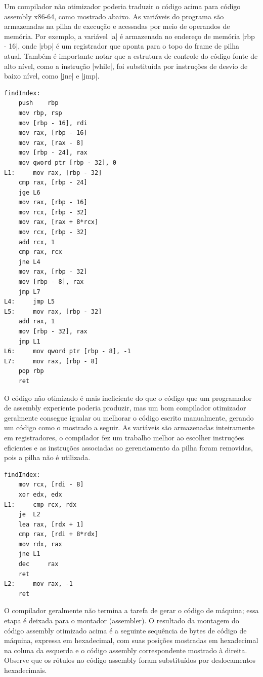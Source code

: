 Um compilador não otimizador poderia traduzir o código acima para
código assembly x86-64, como mostrado abaixo. As variáveis
do programa são armazenadas na pilha de
execução e acessadas por meio de operandos de memória. Por exemplo, a
variável \haskell|a| é armazenada no endereço de
memória \asm|rbp - 16|, onde
\haskell|rbp| é um registrador que aponta para o topo
do frame de pilha atual. Também é importante notar que a estrutura de
controle do código-fonte de alto nível, como a instrução
\javascript|while|, foi substituída por instruções de
desvio de baixo nível, como \asm|jne| e
\asm|jmp|.

\begin{verbatim}
findIndex:
    push    rbp
    mov rbp, rsp
    mov [rbp - 16], rdi
    mov rax, [rbp - 16]
    mov rax, [rax - 8]
    mov [rbp - 24], rax
    mov qword ptr [rbp - 32], 0
L1:     mov rax, [rbp - 32]
    cmp rax, [rbp - 24]
    jge L6
    mov rax, [rbp - 16]
    mov rcx, [rbp - 32]
    mov rax, [rax + 8*rcx]
    mov rcx, [rbp - 32]
    add rcx, 1
    cmp rax, rcx
    jne L4
    mov rax, [rbp - 32]
    mov [rbp - 8], rax
    jmp L7
L4:     jmp L5
L5:     mov rax, [rbp - 32]
    add rax, 1
    mov [rbp - 32], rax
    jmp L1
L6:     mov qword ptr [rbp - 8], -1
L7:     mov rax, [rbp - 8]
    pop rbp
    ret
\end{verbatim}

O código não otimizado é mais ineficiente do que o código que um
programador de assembly experiente poderia produzir, mas um bom
compilador otimizador geralmente consegue igualar ou melhorar o
código escrito manualmente, gerando um código como o mostrado a seguir.
As variáveis são armazenadas inteiramente em registradores, o compilador
fez um trabalho melhor ao
escolher instruções eficientes e as instruções associadas ao
gerenciamento da pilha foram removidas, pois a pilha não é utilizada.

\begin{verbatim}
findIndex:
    mov rcx, [rdi - 8]
    xor edx, edx
L1:     cmp rcx, rdx
    je  L2
    lea rax, [rdx + 1]
    cmp rax, [rdi + 8*rdx]
    mov rdx, rax
    jne L1
    dec     rax
    ret
L2:     mov rax, -1
    ret
\end{verbatim}

O compilador geralmente não termina a tarefa de gerar o código de
máquina; essa etapa é deixada para o montador (assembler). O
resultado da montagem do código assembly otimizado acima é a seguinte
sequência de bytes de código de máquina, expressa em hexadecimal, com
suas posições mostradas em hexadecimal na coluna da esquerda e o
código assembly correspondente mostrado à direita. Observe que os
rótulos no código assembly foram substituídos por deslocamentos hexadecimais.

